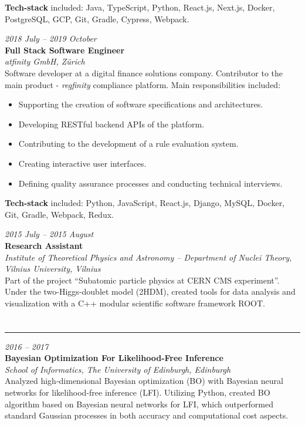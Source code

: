 \documentclass[fontsize=10pt]{article}
\let\oldsection\section
\renewcommand\section[1]{%
	\vspace{-0.5\baselineskip}
    \oldsection{\color{Brown}{#1}}%
	\vspace{-0.5\baselineskip}
    \hrule height 0.75pt
    \vspace{0.75\baselineskip}
}
\newcommand\position[3]{
	{\raggedleft\textit{#1}\\[2.5pt]}%
	{\large\textbf{#2}}\\[2.5pt]%
	\textit{#3}\\[5pt]%
}
\begin{document}
\textbf{Tech-stack} included: Java, TypeScript, Python, React.js, Next.js, Docker, PostgreSQL, GCP, Git, Gradle, Cypress, Webpack.
\vspace{0.75\baselineskip}

\position{2018 July -- 2019 October}{Full Stack Software Engineer}{atfinity GmbH, Z{\"u}rich}
Software developer at a digital finance solutions company. Contributor to the main product - \textit{regfinity} compliance platform. Main responsibilities included:
\begin{itemize}
\setlength\itemsep{0pt}
	\item{Supporting the creation of software specifications and architectures.}
	\item{Developing RESTful backend APIs of the platform.}
	\item{Contributing to the development of a rule evaluation system.}
	\item{Creating interactive user interfaces.}
	\item{Defining quality assurance processes and conducting technical interviews.}
\end{itemize}

\textbf{Tech-stack} included: Python, JavaScript, React.js, Django, MySQL, Docker, Git, Gradle, Webpack, Redux.

\vspace{0.75\baselineskip}

\position{2015 July -- 2015 August}{Research Assistant}{Institute of Theoretical Physics and Astronomy -- Department of Nuclei Theory, Vilnius University, Vilnius}
Part of the project ``Subatomic particle physics at CERN CMS experiment''. Under the two-Higgs-doublet model (2HDM), created tools 
for data analysis and visualization with a C++ modular scientific software framework ROOT.


\section{Research Experience}
\position{2016 -- 2017}{Bayesian Optimization For Likelihood-Free Inference}{School of Informatics, The University of Edinburgh, Edinburgh}
Analyzed high-dimensional Bayesian optimization (BO) with Bayesian neural networks for likelihood-free inference (LFI). 
Utilizing Python, created BO algorithm based on Bayesian neural networks for LFI, which outperformed standard Gaussian 
processes in both accuracy and computational cost aspects.
\vspace{0.75\baselineskip}
\end{document}
